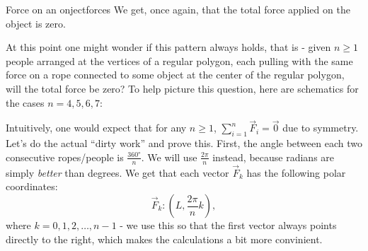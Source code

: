 \begin{example}{Force on an onject}{forces}
  We get, once again, that the total force applied on the object is zero.

  At this point one might wonder if this pattern always holds, that is - given $n\geq1$ people arranged at the vertices of a regular polygon, each pulling with the same force on a rope connected to some object at the center of the regular polygon, will the total force be zero? To help picture this question, here are schematics for the cases $n=4,5,6,7$:

  \newcommand{\nrope}[2]{
    \pgfmathsetmacro{\L}{1.5}
    \pgfmathsetmacro{\n}{#1}
    \pgfmathsetmacro{\m}{\n-1}
    \pgfmathsetmacro{\degs}{int(360/\n)}
    \node[person={black}{}, minimum size=5pt] (\n-O) at (0,0) {};
    \foreach \k in {0,...,\m}{
      \node[person={#2}{}] (\n-\k) at ({\L*cos(\degs*\k)},{\L*sin(\degs*\k)}) {};
      \draw[rope] (\n-\k) -- (O);
      \draw[ropeb] (\n-\k) -- (O);
    }
    \node at (0,{\L*1.5}) {\underline{$n=\n$}};
    \draw[arcnode={-8*\L}{$\ang{\degs}$}] ({\L/2},0) arc (0:{\degs}:{\L/2});
    \draw[thick, dashed] ({\L/2},0) arc (0:{\degs}:{\L/2});
  }
  \begin{center}
    \hspace{1.5cm}

    \vspace{1em}
    \hspace{1.5cm}
  \end{center}

  Intuitively, one would expect that for any $n\geq1$, $\sum\limits_{i=1}^{n}\vec{F}_{i}=\vec{0}$ due to symmetry. Let's do the actual ``dirty work'' and prove this. First, the angle between each two consecutive ropes/people is $\frac{\ang{360}}{n}$. We will use $\frac{2\pi}{n}$ instead, because radians are simply \textit{better} than degrees. We get that each vector $\vec{F}_{k}$ has the following polar coordinates:
  \[
    \vec{F}_{k}: \left(L,\frac{2\pi}{n}k\right),
  \]
  where $k=0,1,2,\dots,n-1$ - we use this so that the first vector always points directly to the right, which makes the calculations a bit more convinient.


\end{example}
